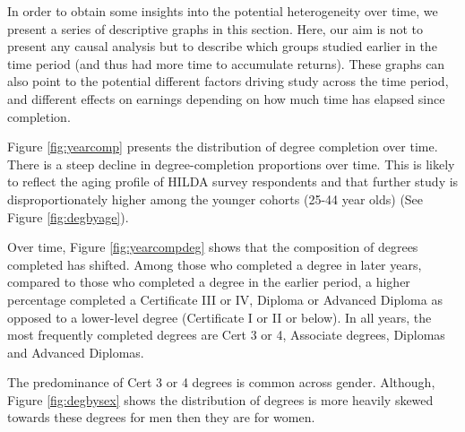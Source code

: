 \documentclass[12pt, a4paper]{article}
\begin{document}
In order to obtain some insights into the potential heterogeneity over time, we present a series of descriptive graphs in this section. Here, our aim is not to present any causal analysis but to describe which groups studied earlier in the time period (and thus had more time to accumulate returns). These graphs can also point to the potential different factors driving study across the time period, and different effects on earnings depending on how much time has elapsed since completion. 

Figure \ref{fig:yearcomp} presents the distribution of degree completion over time. There is a steep decline in degree-completion proportions over time. This is likely to reflect the aging profile of HILDA survey respondents and that further study is disproportionately higher among the younger cohorts (25-44 year olds) (See Figure \ref{fig:degbyage}).

Over time, Figure \ref{fig:yearcompdeg} shows that the composition of degrees completed has shifted. Among those who completed a degree in later years, compared to those who completed a degree in the earlier period, a higher percentage completed a Certificate III or IV, Diploma or Advanced Diploma as opposed to a lower-level degree (Certificate I or II or below). In all years, the most frequently completed degrees are Cert 3 or 4, Associate degrees, Diplomas and Advanced Diplomas. 



The predominance of Cert 3 or 4 degrees is common across gender. Although, Figure \ref{fig:degbysex} shows the distribution of degrees is more heavily skewed towards these degrees for men then they are for women. 
\end{document}
